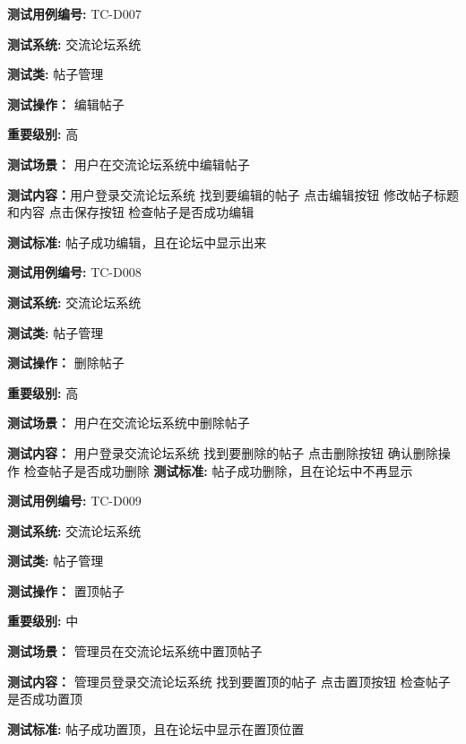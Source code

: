 \begin{framed} \textbf{测试用例编号:} TC-D007

\textbf{测试系统:} 交流论坛系统

\textbf{测试类: } 帖子管理

\textbf{测试操作：} 编辑帖子

\textbf{重要级别:} 高

\textbf{测试场景：} 用户在交流论坛系统中编辑帖子

\textbf{测试内容：}用户登录交流论坛系统 找到要编辑的帖子 点击编辑按钮 修改帖子标题和内容 点击保存按钮 检查帖子是否成功编辑

\textbf{测试标准:} 帖子成功编辑，且在论坛中显示出来

\begin{center}  \end{center} \end{framed}

\begin{framed} \textbf{测试用例编号:} TC-D008

\textbf{测试系统:} 交流论坛系统

\textbf{测试类: } 帖子管理

\textbf{测试操作：} 删除帖子

\textbf{重要级别:} 高

\textbf{测试场景：} 用户在交流论坛系统中删除帖子

\textbf{测试内容：} 用户登录交流论坛系统 找到要删除的帖子 点击删除按钮 确认删除操作 检查帖子是否成功删除
\textbf{测试标准:} 帖子成功删除，且在论坛中不再显示

\begin{center}  \end{center} \end{framed}

\begin{framed} \textbf{测试用例编号:} TC-D009

\textbf{测试系统:} 交流论坛系统

\textbf{测试类: } 帖子管理

\textbf{测试操作：} 置顶帖子

\textbf{重要级别:} 中

\textbf{测试场景：} 管理员在交流论坛系统中置顶帖子

\textbf{测试内容：}  管理员登录交流论坛系统 找到要置顶的帖子 点击置顶按钮 检查帖子是否成功置顶

\textbf{测试标准:} 帖子成功置顶，且在论坛中显示在置顶位置

\begin{center}  \end{center} \end{framed}

